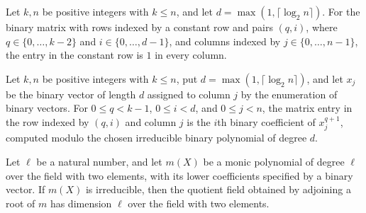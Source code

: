 \begin{theorem}
\label{FABL.executableVandermondeMatrix_constantRow}
\leanok
{}
Let $k,n$ be positive integers with $k\le n$, and let $d=\max(1,\lceil\log_2 n\rceil)$.
For the binary matrix with rows indexed by a constant row and pairs $(q,i)$, where
$q\in\{0,\ldots,k-2\}$ and $i\in\{0,\ldots,d-1\}$, and columns indexed by
$j\in\{0,\ldots,n-1\}$, the entry in the constant row is $1$ in every column.
\end{theorem}

\begin{theorem}
\label{FABL.executableVandermondeMatrix_powerRow}
\leanok
{}
Let $k,n$ be positive integers with $k\le n$, put $d=\max(1,\lceil\log_2 n\rceil)$, and
let $x_j$ be the binary vector of length $d$ assigned to column $j$ by the enumeration
of binary vectors. For $0\le q<k-1$, $0\le i<d$, and $0\le j<n$, the matrix entry in the
row indexed by $(q,i)$ and column $j$ is the $i$th binary coefficient of $x_j^{q+1}$,
computed modulo the chosen irreducible binary polynomial of degree $d$.
\end{theorem}

\begin{theorem}
\label{FABL.executableBinaryField_finrank}
\leanok
{}
Let $\ell$ be a natural number, and let $m(X)$ be a monic polynomial of degree $\ell$
over the field with two elements, with its lower coefficients specified by a binary
vector. If $m(X)$ is irreducible, then the quotient field obtained by adjoining a root
of $m$ has dimension $\ell$ over the field with two elements.
\end{theorem}

